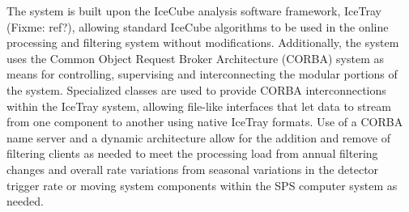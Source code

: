The system is built upon the IceCube analysis software framework, IceTray (Fixme: ref?), allowing standard IceCube algorithms to
be used in the online processing and filtering system without modifications.  Additionally, the system uses the 
Common Object Request Broker Architecture (CORBA) system as means for controlling, supervising and interconnecting
the modular portions of the system.  Specialized classes are used to provide CORBA interconnections
within the IceTray system, allowing file-like interfaces that let data to stream from one component to another
using native IceTray formats.  Use of a CORBA name server and a dynamic architecture allow for the
addition and remove of filtering clients as needed to meet the processing load from annual filtering
changes and overall rate variations from seasonal variations in the detector trigger rate or moving system components within the SPS
computer system as needed.

